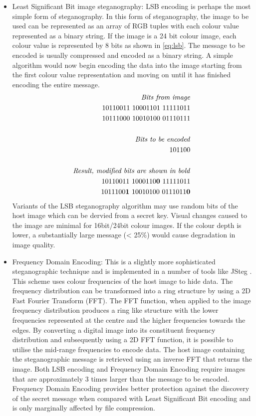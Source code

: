 \begin{itemize}
\item Least Significant Bit image steganography:  LSB encoding is perhaps the most simple form of steganography. In this form of steganography, the image to be used can be represented as an array of RGB tuples with each colour value represented as a binary string. If the image is a 24 bit colour image, each colour value is represented by 8 bits as shown in \ref{eq:lsb}. The message to be encoded is usually compressed and encoded as a binary string. A simple algorithm would now begin encoding the data into the image starting from the first colour value representation and moving on until it has finished encoding the entire message. 
\begin{equation}
\label{eq:lsb}
\begin{split}
\text{\emph{Bits from image}}
\\
10110011\ 10001101\ 11111011 \\
10111000\ 10010100\ 01110111 \\
\\
\text{\emph{Bits to be encoded}}
\\
101100\\
\\
\text{\emph{Result, modified bits are shown in bold}}
\\
10110011\ 1000110\mathbf{0}\ 11111011 \\
1011100\mathbf{1}\ 10010100\ 0111011\mathbf{0} \\
\end{split}
\end{equation}
Variants of the LSB steganography algorithm may use random bits of the host image which can be dervied from a secret key. Visual changes caused to the image are minimal for 16bit/24bit colour images. If the colour depth is lower, a substantially large message (< 25\%) would cause degradation in image quality. 
\item Frequency Domain Encoding: This is a slightly more sophisticated steganographic technique and is implemented in a number of tools like JSteg \cite{jsteg}. This scheme uses colour frequencies of the host image to hide data. The frequency distribution can be transformed into a ring structure by using a 2D Fast Fourier Transform (FFT). The FFT function, when applied to the image frequency distribution produces a ring like structure with the lower frequencies represented at the centre and the higher frequencies towards the edges. By converting a digital image into its constituent frequency distribution and subsequently using a 2D FFT function, it is possible to utilise the mid-range frequencies to encode data. The host image containing the steganographic message is retrieved using an inverse FFT that returns the image. Both LSB encoding and Frequency Domain Encoding require images that are approximately 3 times larger than the message to be encoded. Frequency Domain Encoding provides better protection against the discovery of the secret message when compared with Least Significant Bit encoding and is only marginally affected by file compression. 

\end{itemize}
